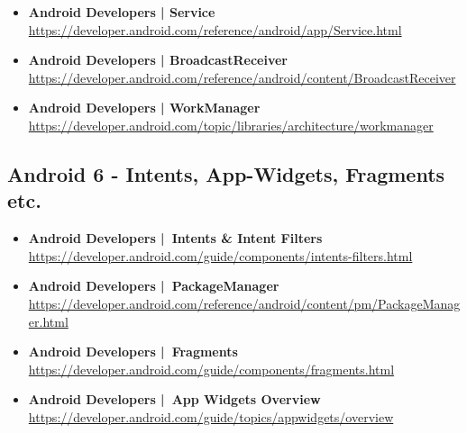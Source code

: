 \documentclass[a4paper]{article}
\begin{document}
{\begin{itemize}
		\item \textbf{Android Developers | Service}\\
		\href{https://developer.android.com/reference/android/app/Service.html}
		{https://developer.android.com/reference/android/app/Service.html}		
		
		\item \textbf{Android Developers | BroadcastReceiver}\\
		\href{https://developer.android.com/reference/android/content/BroadcastReceiver}
		{https://developer.android.com/reference/android/content/BroadcastReceiver}	
		
		\item \textbf{Android Developers | WorkManager}\\
		\href{https://developer.android.com/topic/libraries/architecture/workmanager}
		{https://developer.android.com/topic/libraries/architecture/workmanager}			
		
	\end{itemize}
	
	\subsection{Android 6 - Intents, App-Widgets, Fragments etc.}
	
	\begin{itemize}
		
		\item \textbf{Android Developers | Intents \& Intent Filters}\\
		\href{https://developer.android.com/guide/components/intents-filters.html}
		{https://developer.android.com/guide/components/intents-filters.html}
		
		\item \textbf{Android Developers | PackageManager}\\
		\href{https://developer.android.com/reference/android/content/pm/PackageManager.html}
		{https://developer.android.com/reference/android/content/pm/PackageManager.html}
		
		\item \textbf{Android Developers | Fragments}\\
		\href{https://developer.android.com/guide/components/fragments.html}
		{https://developer.android.com/guide/components/fragments.html}
		
		\item \textbf{Android Developers | App Widgets Overview}\\
		\href{https://developer.android.com/guide/topics/appwidgets/overview}
		{https://developer.android.com/guide/topics/appwidgets/overview}
		

\end{itemize}}
\end{document}
